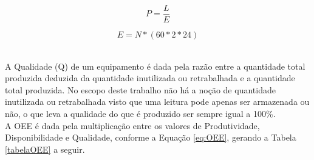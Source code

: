 \begin{equation}
  P = \frac{L}{E}
  \label{eq:prod}
\end{equation}

\begin{equation}
  E = N * (60 * 2 * 24)
  \label{eq:esp}
\end{equation}

\begin{center}
\label{produtividade}
\end{center}

\\\null \quad A Qualidade (Q) de um equipamento é dada pela razão entre a quantidade total produzida deduzida da quantidade inutilizada ou retrabalhada e a quantidade total produzida. No escopo deste trabalho não há a noção de quantidade inutilizada ou retrabalhada visto que uma leitura pode apenas ser armazenada ou não, o que leva a qualidade do que é produzido ser sempre igual a 100\%.
\\\null \quad A \acrshort{OEE} é dada pela multiplicação entre os valores de Produtividade, Disponibilidade e Qualidade, conforme a Equação \ref{eq:OEE}, gerando a Tabela \ref{tabelaOEE} a seguir.


